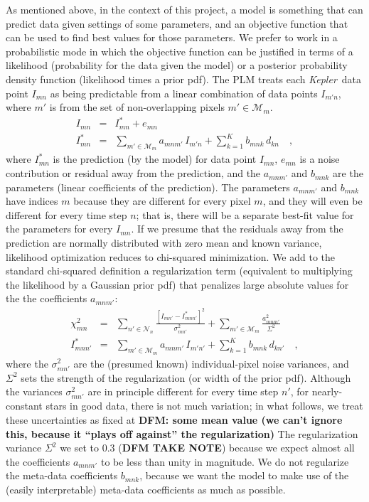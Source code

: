 \documentclass[12pt, preprint]{aastex}
\newcommand{\project}[1]{\textsl{#1}}
\newcommand{\Kepler}{\project{Kepler}}
\newcommand{\set}[1]{\mathcal{#1}}
\newcommand{\todo}[1]{\textbf{#1}}
\begin{document}
As mentioned above, in the context of this project,
  a model is something that can predict data given settings of some parameters,
  and an objective function that can be used to find best values for those parameters.
We prefer to work in a probabilistic mode in which the objective function can be justified
  in terms of a likelihood (probability for the data given the model)
  or a posterior probability density function (likelihood times a prior pdf).
The PLM treats each \Kepler\ data point $I_{mn}$ as being
  predictable from a linear combination of data points $I_{m'n}$,
  where $m'$ is from the set of non-overlapping pixels $m'\in\set{M}_m$.
\begin{eqnarray}
I_{mn}         &=& I^{\ast}_{mn} + e_{mn}
\\
I^{\ast}_{mn}  &=& \sum_{m'\in\set{M}_m} a_{mnm'}\,I_{m'n} + \sum_{k=1}^{K} b_{mnk}\,d_{kn}
\quad,
\end{eqnarray}
where $I^{\ast}_{mn}$ is the prediction (by the model) for data point $I_{mn}$,
  $e_{mn}$ is a noise contribution or residual away from the prediction,
  and the $a_{mnm'}$ and $b_{mnk}$ are the parameters (linear coefficients of the prediction).
The parameters $a_{mnm'}$ and $b_{mnk}$ have indices $m$ because
  they are different for every pixel $m$,
  and they will even be different for every time step $n$;
  that is, there will be a separate best-fit value for the parameters for every $I_{mn}$.
If we presume that the residuals away from the prediction are normally distributed with zero mean
  and known variance,
  likelihood optimization reduces to chi-squared minimization.
We add to the standard chi-squared definition a regularization term
  (equivalent to multiplying the likelihood by a Gaussian prior pdf)
  that penalizes large absolute values for the the coefficients $a_{mnm'}$:
\begin{eqnarray}
\chi^2_{mn}    &=& \sum_{n'\in\set{N}_n} \frac{[I_{mn'} - I^{\ast}_{mnn'}]^2}{\sigma^2_{mn'}}
                 + \sum_{m'\in\set{M}_m} \frac{a_{mnm'}^2}{\Sigma^2}
\\
I^{\ast}_{mnn'} &=& \sum_{m'\in\set{M}_m} a_{mnm'}\,I_{m'n'} + \sum_{k=1}^{K} b_{mnk}\,d_{kn'}
\quad,
\end{eqnarray}
where the $\sigma^2_{mn'}$ are the (presumed known) individual-pixel noise variances,
  and $\Sigma^2$ sets the strength of the regularization (or width of the prior pdf).
Although the variances $\sigma^2_{mn'}$ are in principle different for every time step $n'$,
  for nearly-constant stars in good data, there is not much variation;
  in what follows, we treat these uncertainties as fixed at
  \todo{DFM: some mean value (we can't ignore this,
   because it ``plays off against'' the regularization)}
The regularization variance $\Sigma^2$ we set to 0.3 (\todo{DFM TAKE NOTE})
  because we expect almost all the coefficients $a_{mnm'}$ to be less than unity in magnitude.
We do not regularize the meta-data coefficients $b_{mnk}$,
  because we want the model to make use of the (easily interpretable) meta-data coefficients as much as possible.
\end{document}
